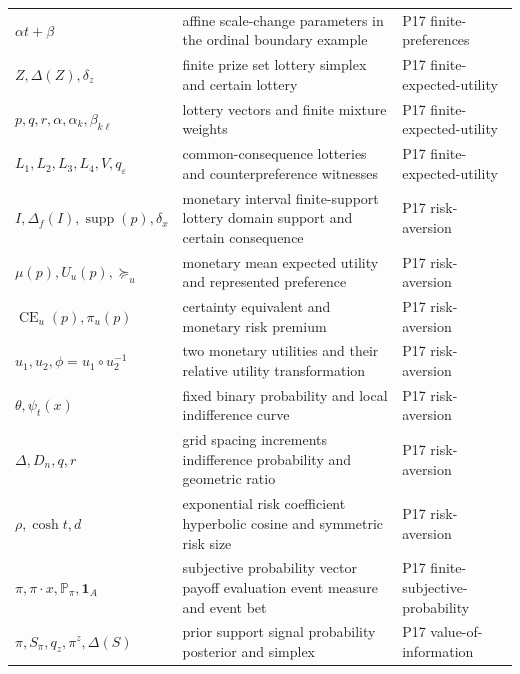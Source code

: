 \begin{longtable}{@{}p{}p{}p{}@{}}
\(\alpha t+\beta\) & affine scale-change parameters in the ordinal boundary example & P17 finite-\allowbreak{}preferences \\
\(Z,\allowbreak \Delta(Z),\allowbreak \delta_z\) & finite prize set lottery simplex and certain lottery & P17 finite-\allowbreak{}expected-\allowbreak{}utility \\
\(p,\allowbreak q,\allowbreak r,\allowbreak \alpha,\allowbreak \alpha_k,\allowbreak \beta_{k\ell}\) & lottery vectors and finite mixture weights & P17 finite-\allowbreak{}expected-\allowbreak{}utility \\
\(L_1,\allowbreak L_2,\allowbreak L_3,\allowbreak L_4,\allowbreak V,\allowbreak q_\varepsilon\) & common-consequence lotteries and counterpreference witnesses & P17 finite-\allowbreak{}expected-\allowbreak{}utility \\
\(I,\allowbreak \Delta_f(I),\allowbreak \operatorname{supp}(p),\allowbreak \delta_x\) & monetary interval finite-support lottery domain support and certain consequence & P17 risk-\allowbreak{}aversion \\
\(\mu(p),\allowbreak U_u(p),\allowbreak \succeq_u\) & monetary mean expected utility and represented preference & P17 risk-\allowbreak{}aversion \\
\(\operatorname{CE}_u(p),\allowbreak \pi_u(p)\) & certainty equivalent and monetary risk premium & P17 risk-\allowbreak{}aversion \\
\(u_1,\allowbreak u_2,\allowbreak \phi=u_1\circ u_2^{-1}\) & two monetary utilities and their relative utility transformation & P17 risk-\allowbreak{}aversion \\
\(\theta,\allowbreak \psi_t(x)\) & fixed binary probability and local indifference curve & P17 risk-\allowbreak{}aversion \\
\(\Delta,\allowbreak D_n,\allowbreak q,\allowbreak r\) & grid spacing increments indifference probability and geometric ratio & P17 risk-\allowbreak{}aversion \\
\(\rho,\allowbreak \cosh t,\allowbreak d\) & exponential risk coefficient hyperbolic cosine and symmetric risk size & P17 risk-\allowbreak{}aversion \\
\(\pi,\allowbreak \pi\cdot x,\allowbreak \mathbb P_\pi,\allowbreak \mathbf1_A\) & subjective probability vector payoff evaluation event measure and event bet & P17 finite-\allowbreak{}subjective-\allowbreak{}probability \\
\(\pi,\allowbreak S_\pi,\allowbreak q_z,\allowbreak \pi^z,\allowbreak \Delta(S)\) & prior support signal probability posterior and simplex & P17 value-\allowbreak{}of-\allowbreak{}information \\

\end{longtable}
